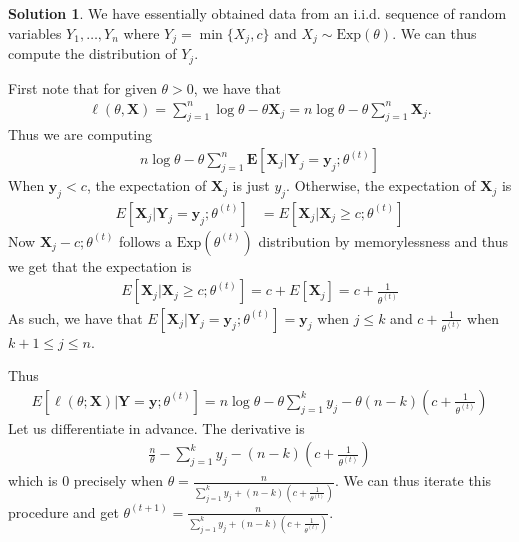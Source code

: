 \documentclass[11pt]{amsart}
\theoremstyle{definition}
\newtheorem{solution}[theorem]{Solution}
\numberwithin{equation}{section}
\begin{document}
\begin{solution}
    We have essentially obtained data from an i.i.d. sequence of random variables $Y_1,\ldots,Y_n$ where $Y_j=\min\{X_j,c\}$ and $X_j\sim\mathrm{Exp}(\theta)$. We can thus compute the distribution of $Y_j$.

    First note that for given $\theta>0$, we have that
    \begin{align*}
        \ell(\theta,\mathbf{X})=\sum_{j=1}^n\log\theta-\theta\mathbf X_j=n\log\theta-\theta\sum_{j=1}^n \mathbf X_j.
    \end{align*}
    Thus we are computing
    \begin{align*}
        n\log\theta-\theta \sum_{j=1}^n\mathbf E[\mathbf X_j|\mathbf Y_j=\mathbf y_j;\theta^{(t)}]
    \end{align*}
    When $\mathbf y_j<c$, the expectation of $\mathbf X_j$ is just $y_j$. Otherwise, the expectation of $\mathbf X_j$ is
    \begin{align*}
        E[\mathbf X_j|\mathbf Y_j=\mathbf y_j;\theta^{(t)}]&=E[\mathbf X_j|\mathbf X_j\ge c;\theta^{(t)}]
    \end{align*}
    Now $\mathbf X_j-c;\theta^{(t)}$ follows a $\mathrm{Exp}(\theta^{(t)})$ distribution by memorylessness and thus we get that the expectation is
    \begin{align*}
        E[\mathbf X_j|\mathbf X_j\ge c;\theta^{(t)}]=c+E[\mathbf X_j]=c+\frac{1}{\theta^{(t)}}
    \end{align*}
    As such, we have that $E[\mathbf X_j|\mathbf Y_j=\mathbf y_j;\theta^{(t)}]=\mathbf y_j$ when $j\le k$ and $c+\frac{1}{\theta^{(t)}}$ when $k+1\le j\le n$.
    
    Thus
    \begin{align*}
        E[\ell(\theta;\mathbf X)|\mathbf Y=\mathbf y;\theta^{(t)}]=n\log \theta-\theta\sum_{j=1}^ky_j-\theta(n-k)(c+\frac{1}{\theta^{(t)}})
    \end{align*}
    Let us differentiate in advance. The derivative is
    \begin{align*}
        \frac{n}{\theta}-\sum_{j=1}^ky_j-(n-k)(c+\frac{1}{\theta^{(t)}})
    \end{align*}
    which is $0$ precisely when $\theta=\frac{n}{\sum_{j=1}^ky_j+(n-k)(c+\frac{1}{\theta^{(t)}})}$. We can thus iterate this procedure and get $\theta^{(t+1)}=\frac{n}{\sum_{j=1}^ky_j+(n-k)(c+\frac{1}{\theta^{(t)}})}$. 


\end{solution}
\end{document}
